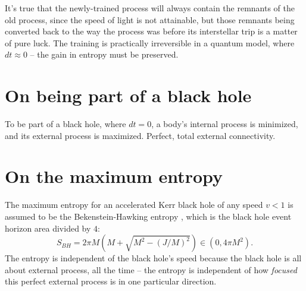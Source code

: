 \documentclass[12pt]{article}
\begin{document}
It's true that the newly-trained process will always contain the remnants of the old process, since the speed of light is not attainable, but those remnants being converted back to the way the process was before its interstellar trip is a matter of pure luck.
The training is practically irreversible in a quantum model, where $dt \approx 0$ -- the gain in entropy must be preserved.






\section{On being part of a black hole}
To be part of a black hole, where $dt = 0$, a body's internal process is minimized, and its external process is maximized.
Perfect, total external connectivity.





\section{On the maximum entropy}

The maximum entropy for an accelerated Kerr black hole of any speed $v < 1$ is assumed to be the Bekenstein-Hawking entropy \cite{jacobson}, which is the black hole event horizon area divided by $4$:
\begin{equation}
S_{BH} = 2 \pi M \left(M + \sqrt{M^2 - (J/M)^2}\right) \in (0, 4\pi M^2).
\end{equation}
The entropy is independent of the black hole's speed because the black hole is all about external process, all the time -- the entropy is independent of how \textit{focused} this perfect external process is in one particular direction.
\end{document}
